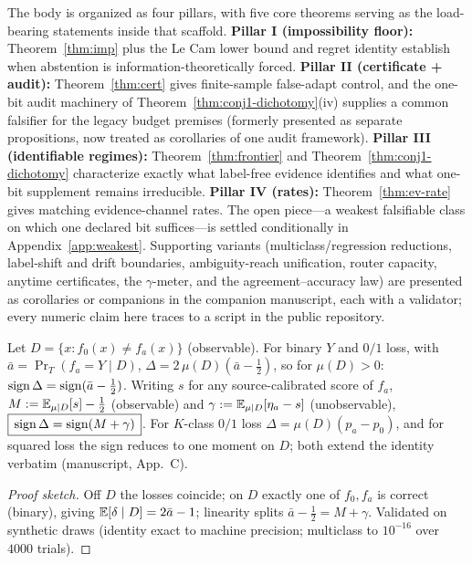 
The body is organized as four pillars, with five core theorems serving as the load-bearing
statements inside that scaffold. \textbf{Pillar I (impossibility floor):}
Theorem~\ref{thm:imp} plus the Le Cam lower bound and regret identity establish when
abstention is information-theoretically forced. \textbf{Pillar II (certificate + audit):}
Theorem~\ref{thm:cert} gives finite-sample false-adapt control, and the one-bit audit
machinery of Theorem~\ref{thm:conj1-dichotomy}(iv) supplies a common falsifier for the
legacy budget premises (formerly presented as separate propositions, now treated as
corollaries of one audit framework). \textbf{Pillar III (identifiable regimes):}
Theorem~\ref{thm:frontier} and Theorem~\ref{thm:conj1-dichotomy} characterize exactly what
label-free evidence identifies and what one-bit supplement remains irreducible.
\textbf{Pillar IV (rates):} Theorem~\ref{thm:ev-rate} gives matching evidence-channel rates.
The open piece---a weakest falsifiable class on which one declared bit suffices---is settled
conditionally in Appendix~\ref{app:weakest}. Supporting variants (multiclass/regression
reductions, label-shift and drift boundaries, ambiguity-reach unification, router capacity,
anytime certificates, the $\gamma$-meter, and the agreement--accuracy law) are presented as
corollaries or companions in the companion manuscript, each with a validator; every numeric
claim here traces to a script in the public repository.

\begin{lemma}\label{lem:reduction}\label{thm:disagree}
Let $D=\{x:f_0(x)\neq f_a(x)\}$ (observable). For binary $Y$ and $0/1$ loss, with
$\bar a=\Pr_T(f_a{=}Y\mid D)$,
$\Delta=2\,\mu(D)(\bar a-\tfrac12)$, so for $\mu(D)>0$:
$\operatorname{sign}\Delta=\operatorname{sign}(\bar a-\tfrac12)$. Writing $s$ for any source-calibrated score of
$f_a$, $M:=\mathbb{E}_{\mu\mid D}[s]-\tfrac12$ (observable) and
$\gamma:=\mathbb{E}_{\mu\mid D}[\eta_a-s]$ (unobservable),
$\boxed{\,\operatorname{sign}\Delta=\operatorname{sign}(M+\gamma)\,}$.
For $K$-class $0/1$ loss $\Delta=\mu(D)(p_a-p_0)$, and for squared loss the sign reduces
to one moment on $D$; both extend the identity verbatim (manuscript, App.~C).
\end{lemma}
\begin{proof}[Proof sketch]
Off $D$ the losses coincide; on $D$ exactly one of $f_0,f_a$ is correct (binary), giving
$\mathbb{E}[\delta\mid D]=2\bar a-1$; linearity splits $\bar a-\tfrac12=M+\gamma$. Validated on synthetic draws (identity exact to machine precision; multiclass to
$10^{-16}$ over $4000$ trials).
\end{proof}

